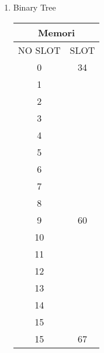 \documentclass[12pt,a4paper]{article}
\begin{document}
\begin{enumerate}
\begin{multicols}{2}
    \end{multicols}

    \newpage
  \item Binary Tree

    \begin{multicols}{2}

      \begin{center}
        \begin{adjustbox}{scale=1,center}
          \begin{tabular}{ |c|c| } 
            \hline \multicolumn{2}{|c|}{Memori} \\ \hline \hline 
            NO SLOT & SLOT  \\ \hline
            0       & 34    \\ \hline
            1       &       \\ \hline
            2       &       \\ \hline
            3       &       \\ \hline
            4       &       \\ \hline
            5       &       \\ \hline
            6       &       \\ \hline
            7       &       \\ \hline
            8       &       \\ \hline
            9       & 60    \\ \hline
            10      &       \\ \hline
            11      &       \\ \hline
            12      &       \\ \hline
            13      &       \\ \hline
            14      &       \\ \hline
            15      &       \\ \hline
            15      & 67    \\ \hline

          \end{tabular}
        \end{adjustbox}
      \end{center}


\end{multicols}
\end{enumerate}
\end{document}
